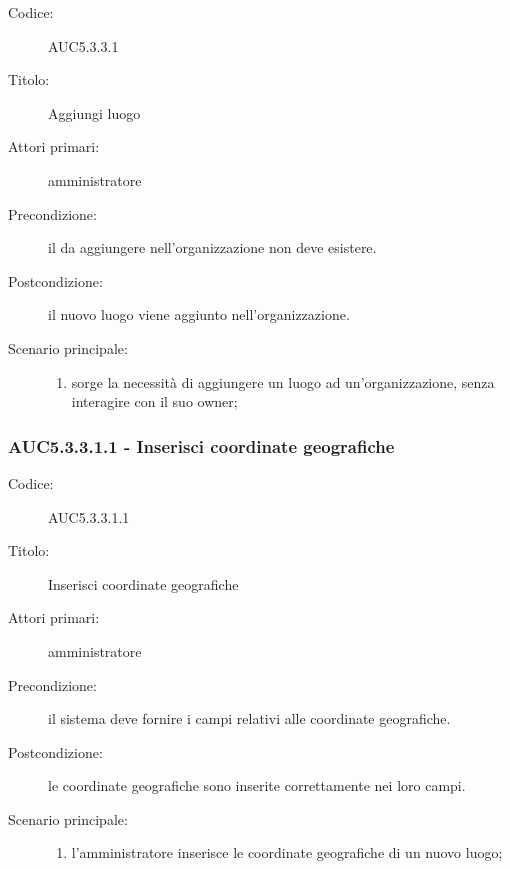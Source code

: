 \documentclass[../analisi-dei-requisiti.tex]{subfiles}
\begin{document}
\begin{description}
  \item[Codice:] AUC5.3.3.1
  \item[Titolo:] Aggiungi luogo
  \item[Attori primari:] amministratore
  \item[Precondizione:] il  da aggiungere nell'organizzazione non deve esistere.
  \item[Postcondizione:] il nuovo luogo viene aggiunto nell'organizzazione.
  \item[Scenario principale:]
  \begin{enumerate}
    \item sorge la necessità di aggiungere un luogo ad un'organizzazione, senza interagire con il suo owner;
  \end{enumerate}
\end{description}

\subsubsection{AUC5.3.3.1.1 - Inserisci coordinate geografiche}%
\label{subsub:AUC5.3.3.1.1}
\begin{description}
  \item[Codice:] AUC5.3.3.1.1
  \item[Titolo:] Inserisci coordinate geografiche
  \item[Attori primari:] amministratore
  \item[Precondizione:] il sistema deve fornire i campi relativi alle coordinate geografiche.
  \item[Postcondizione:] le coordinate geografiche sono inserite correttamente nei loro campi.
  \item[Scenario principale:]
  \begin{enumerate}
    \item l'amministratore inserisce le coordinate geografiche di un nuovo luogo;
  \end{enumerate}
\end{description}
\end{document}
